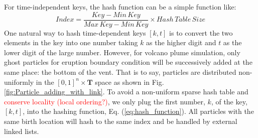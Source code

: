 \documentclass[procedia]{easychair}
\begin{document}
For time-independent keys, the hash function can be a simple function like:
\begin{equation}
Index= \frac{Key - Min\,Key}{Max\,Key - Min\,Key} 
\times Hash\,Table\,Size 
\label{eq:hash_function}
\end{equation}
One natural way to hash time-dependent keys $[k,t]$ is to convert the two elements in the key into one number taking $k$ as the higher digit and $t$ as the lower digit of the large number. However, for volcano plume simulation, only ghost particles for eruption boundary condition will be successively added at the same place: the bottom of the vent. That is to say, particles are distributed non-uniformly in the $[0,1]^n \times \textbf{T}$ space as shown in Fig. \ref{fig:Particle_adding_with_link}. To avoid a non-uniform sparse hash table and \textcolor{red}{conserve locality (local ordering?)}, we only plug the first number, $k$, of the key, $[k,t]$, into the hashing function, Eq. (\ref{eq:hash_function}). All particles with the same birth location will hash to the same index and be handled by external linked lists.
\end{document}
